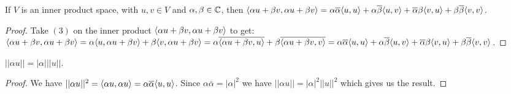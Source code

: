 \begin{lemma}\label{1.4.1}
    If $V$ is an inner product space, with  $u,v \in V$ and  $\alpha,\beta \in \mathbb{C}$, then
    $\langle \alpha u+\beta v, \alpha u+\beta
    v\rangle=\alpha\overline{\alpha}\langle u,u\rangle+\alpha\overline{\beta}\langle u,v\rangle+\overline{\alpha}\beta\langle v,u\rangle+\beta\overline{\beta}\langle v,v\rangle$.
\end{lemma}
\begin{proof}
    Take $(3)$ on the inner product $\langle \alpha u+\beta v, \alpha u+\beta v\rangle$ to get: 
    $\langle \alpha u+\beta v, \alpha u+\beta v\rangle=\alpha\langle u,\alpha u+\beta v\rangle+\beta\langle v,
    \alpha u+\beta v\rangle=\alpha\overline{\langle \alpha u+\beta v,u\rangle}+\beta\overline{\langle \alpha u+\beta
v,v\rangle}=\alpha\overline{\alpha}\langle u,u\rangle+\alpha\overline{\beta}\langle u,v\rangle+\overline{\alpha}\beta\langle v,u\rangle+\beta\overline{\beta}\langle v,v\rangle$.
\end{proof}
\begin{corollary}
    $||\alpha u||=|\alpha|||u||.$
\end{corollary}
\begin{proof}
    We have $||\alpha u||^2=\langle \alpha u, \alpha u\rangle=\alpha\overline{\alpha}\langle u,u\rangle$. Since
    $\alpha\bar{\alpha}=|\alpha|^2$ we have $||\alpha u||=|\alpha|^2||u||^2$ which gives us the
    result.
\end{proof}
